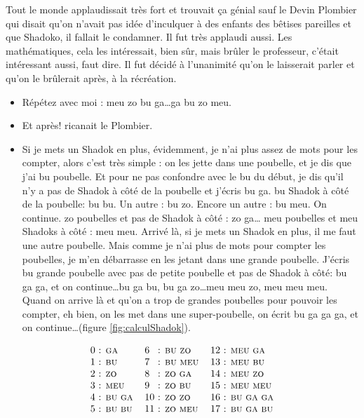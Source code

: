 \begin{td}
Tout le monde applaudissait très fort et trouvait ça génial sauf le Devin Plombier 
qui disait qu'on n'avait pas idée d'inculquer à des enfants des bêtises pareilles 
et que Shadoko, il fallait le condamner. 
Il fut très applaudi aussi. Les mathématiques, 
cela les intéressait, bien sûr, mais brûler le professeur, c'était intéressant aussi, faut dire. 
Il fut décidé à l'unanimité qu'on le laisserait parler et qu'on le brûlerait après, à la récréation.
\begin{itemize}
\item Répétez avec moi : {\sc meu} {\sc zo} {\sc bu} {\sc ga}\ldots {\sc ga} {\sc bu} {\sc zo} {\sc meu}.
\item Et après! ricanait le Plombier.
\item Si je mets un Shadok en plus, évidemment, je n'ai plus assez 
de mots pour les compter, alors c'est très simple : on les jette dans une poubelle, 
et je dis que j'ai {\sc bu} poubelle. Et pour ne pas confondre avec le {\sc bu} du début, 
je dis qu'il n'y a pas de Shadok à côté de la poubelle et j'écris {\sc bu} {\sc ga}. 
{\sc bu} Shadok à côté de la poubelle: {\sc bu} {\sc bu}. Un autre : {\sc bu} {\sc zo}. Encore un autre : {\sc bu} {\sc meu}. 
On continue. {\sc zo} poubelles et pas de Shadok à côté : {\sc zo} {\sc ga}\ldots 
{\sc meu} poubelles et {\sc meu} Shadoks à côté : {\sc meu} {\sc meu}. 
Arrivé là, si je mets un Shadok en plus, il me faut une autre poubelle. 
Mais comme je n'ai plus de mots pour compter les poubelles, je m'en débarrasse 
en les jetant dans une grande poubelle. 
J'écris {\sc bu} grande poubelle avec pas de petite poubelle 
et pas de Shadok à côté: {\sc bu} {\sc ga} {\sc ga}, et on continue\ldots {\sc bu} {\sc ga} {\sc bu}, 
{\sc bu} {\sc ga} {\sc zo}\ldots {\sc meu} {\sc meu} {\sc zo}, {\sc meu} {\sc meu} {\sc meu}.
Quand on arrive là et qu'on a trop de grandes poubelles pour pouvoir les compter, 
eh bien, on les met dans une super-poubelle, on écrit {\sc bu} {\sc ga} {\sc ga} {\sc ga}, 
et on continue\ldots (figure \ref{fig:calculShadok}).
\end{itemize}
\begin{fig}\label{fig:calculShadok}
$$\begin{tabular}[t]{l@{ : }ll@{ : }ll@{ : }l}
0 & {\sc ga} 	      & 6  & {\sc bu} {\sc zo}  & 12 & {\sc meu} {\sc ga}\\
1 & {\sc bu} 	      & 7  & {\sc bu} {\sc meu} & 13 & {\sc meu} {\sc bu}\\
2 & {\sc zo} 	      & 8  & {\sc zo} {\sc ga}  & 14 & {\sc meu} {\sc zo}\\
3 & {\sc meu} 	      & 9  & {\sc zo} {\sc bu}  & 15 & {\sc meu} {\sc meu}\\
4 & {\sc bu} {\sc ga} & 10 & {\sc zo} {\sc zo}  & 16 & {\sc bu} {\sc ga} {\sc ga}\\
5 & {\sc bu} {\sc bu} & 11 & {\sc zo} {\sc meu} & 17 & {\sc bu} {\sc ga} {\sc bu}
\end{tabular}$$
\end{fig}


\end{td}
